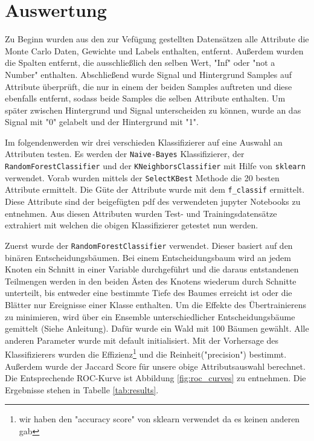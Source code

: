 \section{Auswertung}
\label{sec:auswertung}

Zu Beginn wurden aus den zur Vef\"ugung gestellten Datens\"atzen alle Attribute die Monte Carlo Daten, Gewichte und Labels enthalten, entfernt. Au\ss erdem wurden die Spalten entfernt, die ausschlie\ss lich den selben Wert, "Inf" oder "not a Number" enthalten.
Abschlie\ss end wurde Signal und Hintergrund Samples auf Attribute \"uberpr\"uft, die nur in einem der beiden Samples auftreten und diese ebenfalls entfernt, sodass beide Samples die selben Attribute enthalten.
Um sp\"ater zwischen Hintergrund und Signal unterscheiden zu k\"onnen, wurde an das Signal mit "0" gelabelt und der Hintergrund mit "1".

Im folgendenwerden wir drei verschieden Klassifizierer auf eine Auswahl an Attributen testen. Es werden der \texttt{Naive-Bayes} Klassifizierer, der \texttt{RandomForestClassifier} und der \texttt{KNeighborsClassifier} mit Hilfe von \texttt{sklearn} verwendet.
Vorab wurden mittels der \texttt{SelectKBest} Methode die 20 besten Attribute ermittelt. Die G\"ute der Attribute wurde mit dem \texttt{f\_classif} ermittelt.
Diese Attribute sind der beigef\"ugten pdf des verwendeten jupyter Notebooks zu entnehmen.
Aus diesen Attributen wurden Test- und Trainingsdatens\"atze extrahiert mit welchen die obigen Klassifizierer getestet nun werden.

Zuerst wurde der \texttt{RandomForestClassifier} verwendet. Dieser basiert auf den bin\"aren Entscheidungsb\"aumen.
Bei einem Entscheidungsbaum wird an jedem Knoten ein Schnitt in einer Variable durchgeführt und die daraus entstandenen Teilmengen werden in den beiden Ästen des Knotens wiederum durch Schnitte unterteilt, bis entweder eine bestimmte Tiefe
des Baumes erreicht ist oder die Blätter nur Ereignisse einer Klasse enthalten. Um die Effekte des Übertrainierens zu minimieren, wird über ein Ensemble unterschiedlicher
Entscheidungsbäume gemittelt (Siehe Anleitung).
Daf\"ur wurde ein Wald mit 100 B\"aumen gew\"ahlt. Alle anderen Parameter wurde mit default initialisiert.
Mit der Vorhersage des Klassifizierers wurden die Effizienz\footnote{wir haben den "accuracy score" von sklearn verwendet da es keinen anderen gab} und die Reinheit("precision") bestimmt.
Au\ss erdem wurde der Jaccard Score f\"ur unsere obige Attributsauswahl berechnet. Die Entsprechende ROC-Kurve ist Abbildung \ref{fig:roc_curves} zu entnehmen.
Die Ergebnisse stehen in Tabelle \ref{tab:results}.


